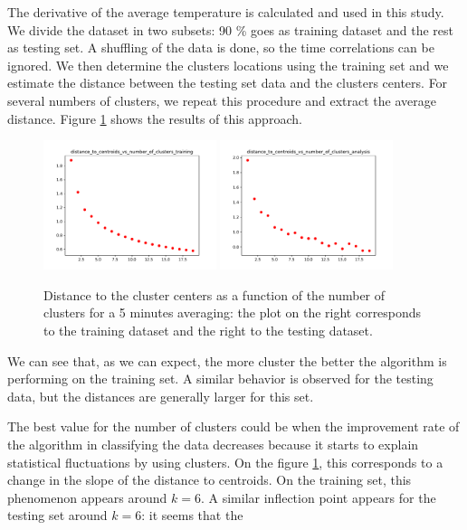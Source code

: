 \documentclass[11pt]{amsart}
\begin{document}
The derivative of the average temperature is calculated and used in this study.
We divide the dataset in two subsets: 90 \% goes as training dataset and the rest as testing set.
A shuffling of the data is done, so the time correlations can be ignored.
We then determine the clusters locations using the training set and we estimate the distance between the testing set data and the clusters centers.
For several numbers of clusters, we repeat this procedure and extract the average distance.
Figure \ref{fig:distance_to_centroids2} shows the results of this approach.
\begin{figure}
    \includegraphics[width=0.45\textwidth]{../plots/distance_to_centroids_vs_number_of_clusters_training_5.pdf}
    \includegraphics[width=0.45\textwidth]{../plots/distance_to_centroids_vs_number_of_clusters_analysis_5.pdf}
    \caption{\label{fig:distance_to_centroids2} Distance to the cluster centers as a function of the number of clusters for a 5 minutes averaging: the plot on the right corresponds to the training dataset and the right to the testing dataset.}
\end{figure}
We can see that, as we can expect, the more cluster the better the algorithm is performing on the training set.
A similar behavior is observed for the testing data, but the distances are generally larger for this set.

The best value for the number of clusters could be when the improvement rate of the algorithm in classifying the data decreases because it starts to explain statistical fluctuations by using clusters.
On the figure \ref{fig:distance_to_centroids2}, this corresponds to a change in the slope of the distance to centroids.
On the training set, this phenomenon appears around $k=6$.
A similar inflection point appears for the testing set around $k=6$: it seems that the 
\end{document}
